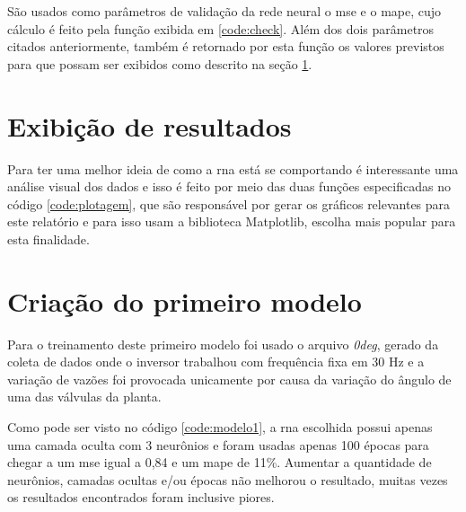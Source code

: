 \documentclass[12pt]{article}
\begin{document}


São usados como parâmetros de validação da rede neural o \acrfull{mse} e o \acrfull{mape}, cujo cálculo é feito pela função exibida em \ref{code:check}. Além dos dois parâmetros citados anteriormente, também é retornado por esta função os valores previstos para que possam ser exibidos como descrito na seção \ref{sec:exibicao}.

\section{Exibição de resultados}
\label{sec:exibicao}



Para ter uma melhor ideia de como a \acrshort{rna} está se comportando é interessante uma análise visual dos dados e isso é feito por meio das duas funções especificadas no código \ref{code:plotagem}, que são responsável por gerar os gráficos relevantes para este relatório e para isso usam a biblioteca Matplotlib, escolha mais popular para esta finalidade.

\section {Criação do primeiro modelo}
\label{sec:modelo1}



Para o treinamento deste primeiro modelo foi usado o arquivo \textit{0deg}, gerado da coleta de dados onde o inversor trabalhou com frequência fixa em 30 Hz e a variação de vazões foi provocada unicamente por causa da variação do ângulo de uma das válvulas da planta.

Como pode ser visto no código \ref{code:modelo1}, a \acrshort{rna} escolhida possui apenas uma camada oculta com 3 neurônios e foram usadas apenas 100 épocas para chegar a um \acrshort{mse} igual a 0,84 e um \acrshort{mape} de 11\%. Aumentar a quantidade de neurônios, camadas ocultas e/ou épocas não melhorou o resultado, muitas vezes os resultados encontrados foram inclusive piores.
\end{document}
